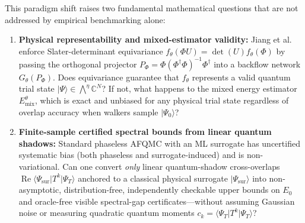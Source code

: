 \documentclass[11pt,a4paper]{article}
\theoremstyle{definition}
\newcommand{\C}{\mathbb{C}}
\newcommand{\ket}[1]{\lvert #1 \rangle}
\newcommand{\bra}[1]{\langle #1 \rvert}
\begin{document}
This paradigm shift raises two fundamental mathematical questions that are not addressed by empirical benchmarking alone:
\begin{enumerate}[leftmargin=1.5em]
  \item \textbf{Physical representability and mixed-estimator validity:} Jiang et al.\ \cite[Eq.~(S2.19)]{jiang2026machine} enforce Slater-determinant equivariance $f_\theta(\Phi U) = \det(U) f_\theta(\Phi)$ by passing the orthogonal projector $P_\Phi = \Phi(\Phi^\dagger \Phi)^{-1} \Phi^\dagger$ into a backflow network $G_\theta(P_\Phi)$. Does equivariance guarantee that $f_\theta$ represents a valid quantum trial state $\ket{\Psi} \in \bigwedge^\eta \C^N$? If not, what happens to the mixed energy estimator $E_{\mathrm{mix}}^\theta$, which is exact and unbiased for any physical trial state regardless of overlap accuracy when walkers sample $\ket{\Psi_0}$?
  \item \textbf{Finite-sample certified spectral bounds from linear quantum shadows:} Standard phaseless AFQMC with an ML surrogate has uncertified systematic bias (both phaseless and surrogate-induced) and is non-variational. Can one convert \emph{only} linear quantum-shadow cross-overlaps $\operatorname{Re}\bra{\Psi_{\mathrm{sur}}} T^k \ket{\Psi_T}$ anchored to a classical physical surrogate $\ket{\Psi_{\mathrm{sur}}}$ into non-asymptotic, distribution-free, independently checkable upper bounds on $E_0$ and oracle-free visible spectral-gap certificates---without assuming Gaussian noise or measuring quadratic quantum moments $c_k = \bra{\Psi_T} T^k \ket{\Psi_T}$?
\end{enumerate}
\end{document}
